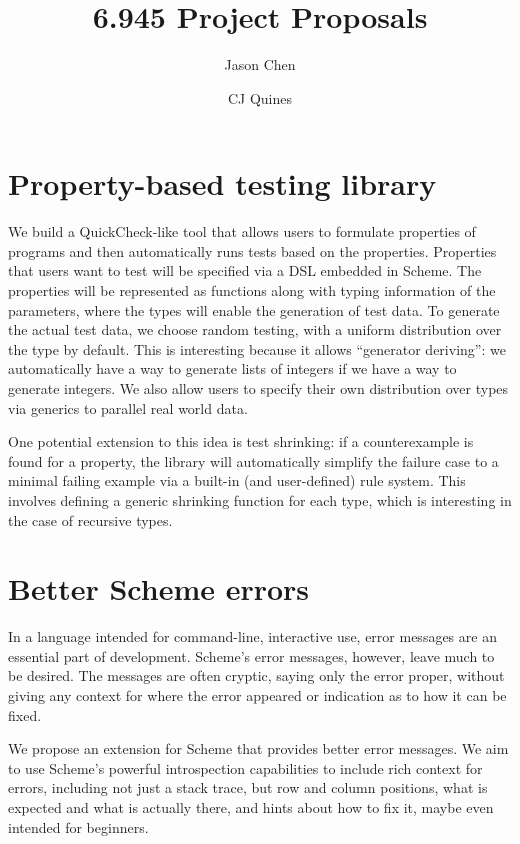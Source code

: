 \documentclass{scrartcl}
\title{6.945 Project Proposals}
\author{Jason Chen \and CJ Quines}
\begin{document}
\maketitle

\section{Property-based testing library}
We build a QuickCheck-like tool that allows users to
formulate properties of programs and then
automatically runs tests based on the properties.
Properties that users want to test will be specified
via a DSL embedded in Scheme.
The properties will be represented as functions
along with typing information of the parameters,
where the types will enable the generation of test data.
To generate the actual test data, we choose random testing,
with a uniform distribution over the type by default.
This is interesting because it allows ``generator deriving'':
we automatically have a way to generate lists of integers
if we have a way to generate integers.
We also allow users to specify their own distribution
over types via generics to parallel real world data. %

One potential extension to this idea is test shrinking:
if a counterexample is found for a property,
the library will automatically simplify
the failure case to a minimal failing example
via a built-in (and user-defined) rule system.
This involves defining a generic shrinking function for each type,
which is interesting in the case of recursive types.



\section{Better Scheme errors}

In a language intended for command-line, interactive use, error messages are an
essential part of development. Scheme's error messages, however, leave much to
be desired. The messages are often cryptic, saying only the error proper,
without giving any context for where the error appeared or indication as to how
it can be fixed.

We propose an extension for Scheme that provides better error messages. We aim
to use Scheme's powerful introspection capabilities to include rich context for
errors, including not just a stack trace, but row and column positions, what is
expected and what is actually there, and hints about how to fix it, maybe even
intended for beginners.
\end{document}
